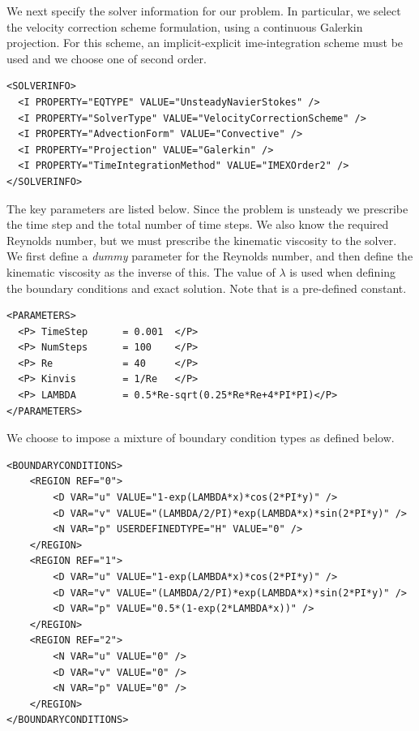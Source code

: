 We next specify the solver information for our problem. In particular, we select
the velocity correction scheme formulation, using a continuous Galerkin
projection. For this scheme, an implicit-explicit ime-integration scheme must be
used and we choose one of second order.
\begin{lstlisting}[style=XMLStyle]
<SOLVERINFO>
  <I PROPERTY="EQTYPE" VALUE="UnsteadyNavierStokes" />
  <I PROPERTY="SolverType" VALUE="VelocityCorrectionScheme" />
  <I PROPERTY="AdvectionForm" VALUE="Convective" />
  <I PROPERTY="Projection" VALUE="Galerkin" />
  <I PROPERTY="TimeIntegrationMethod" VALUE="IMEXOrder2" />
</SOLVERINFO>
\end{lstlisting}

The key parameters are listed below. Since the problem is unsteady we prescribe
the time step and the total number of time steps. We also know the required
Reynolds number, but we must prescribe the kinematic viscosity to the solver. We
first define a \emph{dummy} parameter for the Reynolds number, and then define
the kinematic viscosity as the inverse of this. The value of $\lambda$ is used
when defining the boundary conditions and exact solution. Note that 
is a pre-defined constant.

\begin{lstlisting}[style=XMLStyle]
<PARAMETERS>
  <P> TimeStep      = 0.001  </P>
  <P> NumSteps      = 100    </P>
  <P> Re            = 40     </P>
  <P> Kinvis        = 1/Re   </P>
  <P> LAMBDA        = 0.5*Re-sqrt(0.25*Re*Re+4*PI*PI)</P>
</PARAMETERS>
\end{lstlisting}

We choose to impose a mixture of boundary condition types as defined below.

\begin{lstlisting}[style=XMLStyle]
<BOUNDARYCONDITIONS>
    <REGION REF="0">
        <D VAR="u" VALUE="1-exp(LAMBDA*x)*cos(2*PI*y)" />
        <D VAR="v" VALUE="(LAMBDA/2/PI)*exp(LAMBDA*x)*sin(2*PI*y)" />
        <N VAR="p" USERDEFINEDTYPE="H" VALUE="0" />
    </REGION>
    <REGION REF="1">
        <D VAR="u" VALUE="1-exp(LAMBDA*x)*cos(2*PI*y)" />
        <D VAR="v" VALUE="(LAMBDA/2/PI)*exp(LAMBDA*x)*sin(2*PI*y)" />
        <D VAR="p" VALUE="0.5*(1-exp(2*LAMBDA*x))" />
    </REGION>
    <REGION REF="2">
        <N VAR="u" VALUE="0" />
        <D VAR="v" VALUE="0" />
        <N VAR="p" VALUE="0" />
    </REGION>
</BOUNDARYCONDITIONS>
\end{lstlisting}

